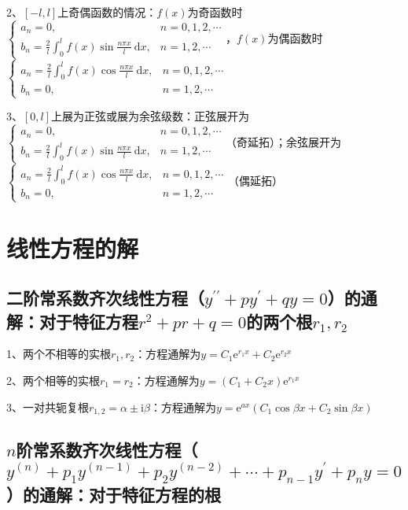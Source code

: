 2、$[-l, l]$上奇偶函数的情况：$f(x)$为奇函数时$\begin{cases}a_{n}=0, & n=0,1,2, \cdots \\ b_{n}=\frac{2}{l} \int_{0}^{l} f(x) \sin \frac{n \pi x}{l} \mathrm{~d} x, & n=1,2, \cdots\end{cases}$，$f(x)$为偶函数时$\begin{cases}a_{n}=\frac{2}{l} \int_{0}^{l} f(x) \cos \frac{n \pi x}{l} \mathrm{~d} x, & n=0,1,2, \cdots \\ b_{n}=0, & n=1,2, \cdots\end{cases}$

3、$[0, l]$上展为正弦或展为余弦级数：正弦展开为$\begin{cases}a_{n}=0, & n=0,1,2, \cdots \\ b_{n}=\frac{2}{l} \int_{0}^{l} f(x) \sin \frac{n \pi x}{l} \mathrm{~d} x, & n=1,2, \cdots\end{cases}$（奇延拓）；余弦展开为$\begin{cases}a_{n}=\frac{2}{l} \int_{0}^{l} f(x) \cos \frac{n \pi x}{l} \mathrm{~d} x, & n=0,1,2, \cdots \\ b_{n}=0, & n=1,2, \cdots\end{cases}$（偶延拓）

\section{线性方程的解}



\subsection{二阶常系数齐次线性方程（$y^{\prime \prime}+p y^{\prime}+q y=0$）的通解：对于特征方程$r^{2}+p r+q=0$的两个根$ r_{1}, r_{2} $}

1、两个不相等的实根$r_{1}, r_{2}$：方程通解为$ y=C_{1} \mathrm{e}^{r_1 x}+C_{2} \mathrm{e}^{r_2 x}$

2、两个相等的实根$r_{1}=r_{2}$：方程通解为$y=\left(C_{1}+C_{2} x\right) \mathrm{e}^{r_1 x}$

3、一对共轭复根$r_{1,2}=\alpha \pm \mathrm{i} \beta$：方程通解为$y=\mathrm{e}^{a x}\left(C_{1} \cos \beta x+C_{2} \sin \beta x\right)$



\subsection{$n$阶常系数齐次线性方程（$y^{(n)}+p_{1} y^{(n-1)}+p_{2} y^{(n-2)}+\cdots+p_{n-1} y^{\prime}+p_{n} y=0$）的通解：对于特征方程的根}

